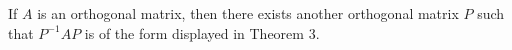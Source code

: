 If $A$ is an orthogonal matrix, then there exists another orthogonal matrix $P$ such that $P^{-1} A P$ is of the form displayed in Theorem 3.
